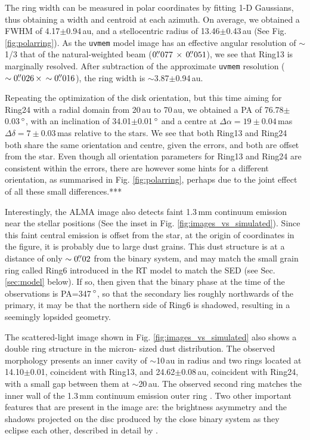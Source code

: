 \documentclass[letters,usenatbib,times]{mnras}
\begin{document}
The ring width can be measured in polar coordinates by fitting 1-D Gaussians, thus obtaining a width and centroid at each azimuth. On average, we obtained a FWHM of 4.17$\pm$0.94\,au, and a stellocentric radius of 13.46$\pm$0.43\,au (See Fig. \ref{fig:polarring}). As the {\tt uvmem} model image has an effective angular resolution of $\sim$1/3 that of the natural-weighted beam ($0\hbox{$.\!\!^{\prime\prime}$}077 \,\times \, 0\hbox{$.\!\!^{\prime\prime}$}051$), we see that Ring13 is marginally resolved. After subtraction of the approximate {\tt uvmem} resolution ($\sim0\hbox{$.\!\!^{\prime\prime}$}026 \, \times \, \sim0\hbox{$.\!\!^{\prime\prime}$}016$), the ring width is $\sim$3.87$\pm$0.94\,au. 

Repeating the optimization of the disk orientation, but this time aiming for Ring24 with a radial domain from 20\,au to 70\,au, we obtained a PA of 76.78$\pm$0.03\,$\hbox{$^\circ$}$, with an inclination of 34.01$\pm$0.01\,$\hbox{$^\circ$}$ and a centre at $\Delta \alpha = 19\pm0.04$\,mas $\Delta \delta = 7\pm0.03$\,mas relative to the stars. We see that both Ring13 and Ring24 both share the same orientation and centre, given the errors, and both are offset from the star. Even though all orientation parameters for Ring13 and Ring24 are consistent within the errors, there are however some hints for a different orientation, as summarised in Fig. \ref{fig:polarring}, perhaps due to the joint effect of all these small differences.***

Interestingly, the ALMA image also detects faint 1.3\,mm continuum emission near the stellar positions (See the inset in Fig. \ref{fig:images_vs_simulated}). Since this faint central emission is offset from the star, at the origin of coordinates in the figure, it is probably due to large dust grains. This dust structure is at a distance of only $\sim0\hbox{$.\!\!^{\prime\prime}$}02$ from the binary system, and may match the small grain ring called Ring6 introduced in the RT model to match the SED (see Sec.\,\ref{sec:model} below). If so, then given that the binary phase at the time of the observations is PA=347\,$\hbox{$^\circ$}$, so that the secondary lies roughly northwards of the primary, it may be that the northern side of Ring6 is shadowed, resulting in a seemingly lopsided geometry.

The scattered-light image shown in Fig. \ref{fig:images_vs_simulated} also shows a double ring structure in the micron-
sized dust distribution. The observed morphology presents an inner cavity of $\sim$10\,au in radius and two rings located at 14.10$\pm$0.01, coincident with Ring13, and 24.62$\pm$0.08\,au, coincident with Ring24, with a small gap between them at $\sim$20\,au. The observed second ring matches the inner wall of the 1.3\,mm continuum emission outer ring \citep{Ru_z_Rodr_guez_2019}. Two other important features that are present in the image are: the brightness asymmetry and the shadows projected on the disc produced by the close binary system as they eclipse each other, described in detail by \citet{dOrazi}.
\end{document}
